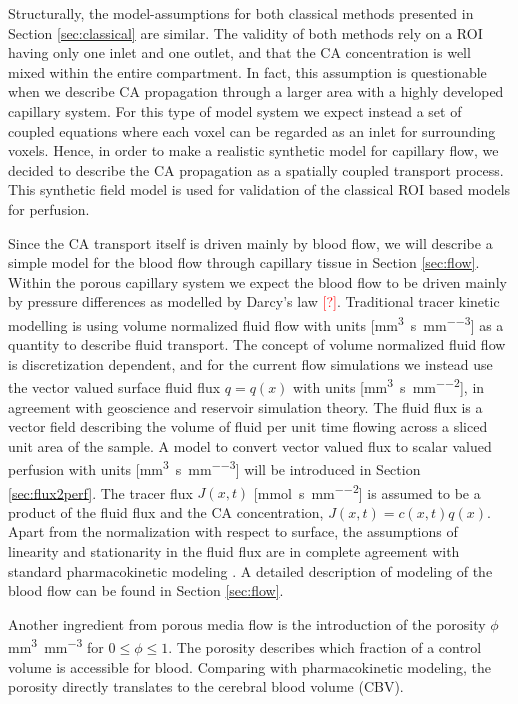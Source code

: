 \documentclass[paper=a4, fontsize=11pt,parskip=half,headings=small]{scrartcl}
\newcommand{\siQmm}{\milli\meter\cubed\per\second\per\milli\meter\cubed}
\newcommand{\siq}{\milli\meter\cubed\per\second\per\milli\meter\squared}
\newcommand{\siJ}{\milli\mol\per\second\per\milli\meter\squared}
\newcommand{\siphi}{\milli\meter\cubed\per\milli\meter\cubed}
\newcommand{\missingsource}{\textcolor{red}{[?]}}
\begin{document}
	Structurally, the model-assumptions for both classical methods presented in Section \ref{sec:classical} are similar.
	The validity of both methods rely on a ROI having only one inlet and one outlet, and that the CA concentration is well mixed within the entire compartment.
	In fact, this assumption is questionable when we describe CA propagation through a larger area with a highly developed capillary system.
	For this type of model system we expect instead a set of coupled equations where each voxel can be regarded as an inlet for surrounding voxels.
	Hence, in order to make a realistic synthetic model for capillary flow, we decided to describe the CA propagation as a spatially coupled transport process. This synthetic field model is used for validation of the classical ROI based models for perfusion. 
	
	Since the CA transport itself is driven mainly by blood flow, we will describe a simple model for the blood flow through capillary tissue in Section \ref{sec:flow}.
	Within the porous capillary system we expect the blood flow to be driven mainly by pressure differences as modelled by Darcy's law \missingsource. Traditional tracer kinetic modelling is using volume normalized fluid flow with units [\si{\siQmm}] as a quantity to describe fluid transport. 
	The concept of volume normalized fluid flow is discretization dependent, and for the current flow simulations we instead use the vector valued surface fluid flux $q = q(x)$ with units [\si{\siq}], in agreement with geoscience and reservoir simulation theory.
	The fluid flux is a vector field describing the volume of fluid per unit time flowing across a sliced unit area of the sample.	
	A model to convert vector valued flux to scalar valued perfusion with units [\si{\siQmm}] will be introduced in Section \ref{sec:flux2perf}.
	The tracer flux $J(x,t)$  [\si{\siJ}] is assumed to be a product of the fluid flux and the CA concentration, $J(x,t) = c(x,t)q(x)$.
	Apart from the normalization with respect to surface, the assumptions of linearity and stationarity in the fluid flux are in complete agreement with standard pharmacokinetic modeling \cite{sourbron13}.
	A detailed description of modeling of the blood flow can be found in Section \ref{sec:flow}.

	Another ingredient from porous media flow is the introduction of the porosity $\phi$ \si{\siphi} for $0 \le \phi \le 1$.
	The porosity describes which fraction of a control volume is accessible for blood.
	Comparing with pharmacokinetic modeling, the porosity directly translates to the cerebral blood volume (CBV).
	
\end{document}
